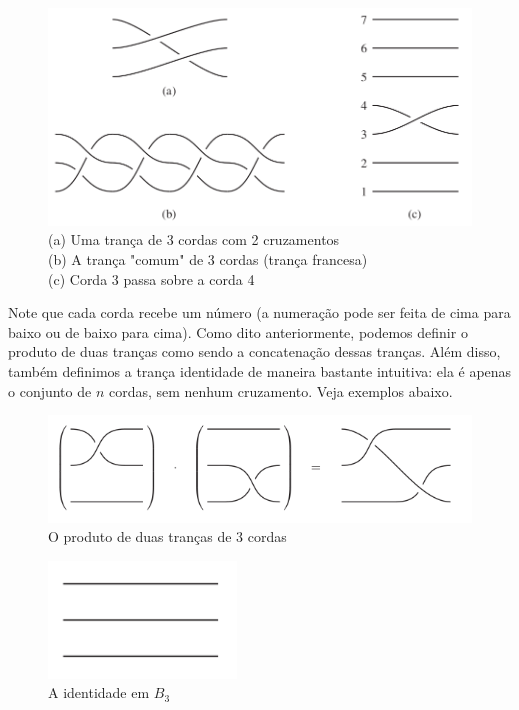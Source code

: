 \documentclass[a4paper,portuguese,11pt,twoside, leqno]{book}
\theoremstyle{definition}
\begin{document}
	\begin{figure}[H]
		\captionsetup{justification=centering}
		\begin{center}
			\includegraphics[width=12cm]{Images/exemplos_diagrama.png}
			\caption{
				(a) Uma trança de 3 cordas com 2 cruzamentos \\
				(b) A trança "comum" de 3 cordas (trança francesa) \\
				(c) Corda 3 passa sobre a corda 4
			}\label{diagramas de trancas}\end{center}
	\end{figure}
	
	\par\vspace{0.3cm} Note que cada corda recebe um número (a numeração pode ser feita de cima para baixo ou de baixo para cima). Como dito anteriormente, podemos definir o produto de duas tranças como sendo a concatenação dessas tranças. Além disso, também definimos a trança identidade de maneira bastante intuitiva: ela é apenas o conjunto de $n$ cordas, sem nenhum cruzamento. Veja exemplos abaixo.
	
	\begin{figure}[H]
		\captionsetup{justification=centering}
		\begin{center}
			\includegraphics[width=12cm]{Images/produto.png}
		\end{center}\caption{O produto de duas tranças de 3 cordas
		}\label{produto de trancas}
	\end{figure}
	
	\begin{figure}[H]
		\captionsetup{justification=centering}
		\begin{center}
			\includegraphics[width=5cm]{Images/identidade_b3.png}
		\end{center}\caption{A identidade em $B_3$}\label{identidade em b3}
	\end{figure}
	
\end{document}
